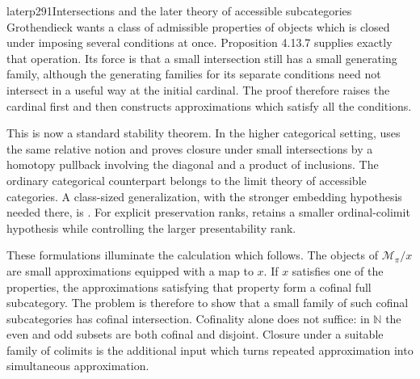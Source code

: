 \begin{dcomment}{later}{p291}{Intersections and the later theory of accessible subcategories}
Grothendieck wants a class of admissible properties of objects which is closed under imposing several conditions at once. Proposition 4.13.7 supplies exactly that operation. Its force is that a small intersection still has a small generating family, although the generating families for its separate conditions need not intersect in a useful way at the initial cardinal. The proof therefore raises the cardinal first and then constructs approximations which satisfy all the conditions.

This is now a standard stability theorem. In the higher categorical setting, \citet[Definition 5.4.7.8 and Proposition 5.4.7.10]{Lurie2009HTT} uses the same relative notion and proves closure under small intersections by a homotopy pullback involving the diagonal and a product of inclusions. The ordinary categorical counterpart belongs to the limit theory of accessible categories. A class-sized generalization, with the stronger embedding hypothesis needed there, is \citet[Corollary 3.3]{ChornyRosicky2012}. For explicit preservation ranks, \citet[Corollary 5.1 and Theorem 9.1]{Positselski2024Limits} retains a smaller ordinal-colimit hypothesis while controlling the larger presentability rank.

These formulations illuminate the calculation which follows. The objects of $\mathcal M_\pi/x$ are small approximations equipped with a map to $x$. If $x$ satisfies one of the properties, the approximations satisfying that property form a cofinal full subcategory. The problem is therefore to show that a small family of such cofinal subcategories has cofinal intersection. Cofinality alone does not suffice: in $\mathbb N$ the even and odd subsets are both cofinal and disjoint. Closure under a suitable family of colimits is the additional input which turns repeated approximation into simultaneous approximation.
\end{dcomment}

